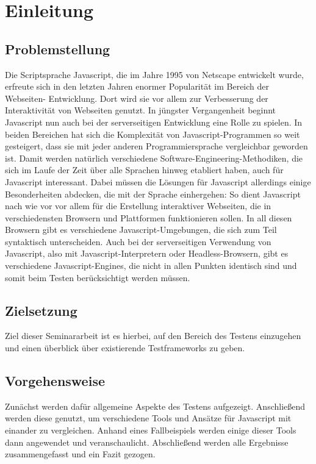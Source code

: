 \section{Einleitung}

\subsection{Problemstellung}

Die Scriptsprache Javascript, die im Jahre 1995 von Netscape entwickelt wurde, erfreute sich in den letzten Jahren enormer Popularität im Bereich der Webseiten- Entwicklung. Dort wird sie vor allem zur Verbesserung der Interaktivität von Webseiten genutzt. In jüngster Vergangenheit beginnt Javascript nun auch bei der serverseitigen Entwicklung eine Rolle zu spielen. In beiden Bereichen hat sich die Komplexität von Javascript-Programmen so weit gesteigert, dass sie mit jeder anderen Programmiersprache vergleichbar geworden ist. Damit werden natürlich verschiedene Software-Engineering-Methodiken, die sich im Laufe der Zeit über alle Sprachen hinweg etabliert haben, auch für Javascript interessant. Dabei müssen die Lösungen für Javascript allerdings einige Besonderheiten abdecken, die mit der Sprache einhergehen: So dient Javascript nach wie vor vor allem für die Erstellung interaktiver Webseiten, die in verschiedensten Browsern und Plattformen funktionieren sollen. In all diesen Browsern gibt es verschiedene Javascript-Umgebungen, die sich zum Teil syntaktisch unterscheiden. Auch bei der serverseitigen Verwendung von Javascript, also mit Javascript-Interpretern oder Headless-Browsern, gibt es verschiedene Javascript-Engines, die nicht in allen Punkten identisch sind und somit beim Testen berücksichtigt werden müssen.

\subsection{Zielsetzung}

Ziel dieser Seminararbeit ist es hierbei, auf den Bereich des Testens einzugehen und einen überblick über existierende Testframeworks zu geben.

\subsection{Vorgehensweise}

Zunächst werden dafür allgemeine Aspekte des Testens aufgezeigt. Anschließend werden diese genutzt, um verschiedene Tools und Ansätze für Javascript mit einander zu vergleichen. Anhand eines Fallbeispiels werden einige dieser Tools dann angewendet und veranschaulicht. Abschließend werden alle Ergebnisse zusammengefasst und ein Fazit gezogen.

